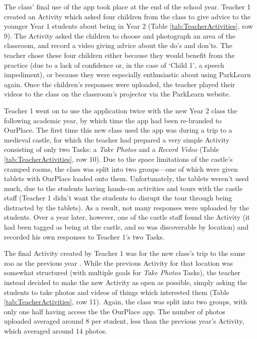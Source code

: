 The class' final use of the app took place at the end of the school year. Teacher 1 created an Activity which asked four children from the class to give advice to the younger Year 1 students about being in Year 2 (Table \ref{tab:TeacherActivities}, row 9). The Activity asked the children to choose and photograph an area of the classroom, and record a video giving advice about the do’s and don’ts. The teacher chose these four children either because they would benefit from the practice (due to a lack of confidence or, in the case of ‘Child 1’, a speech impediment), or because they were especially enthusiastic about using ParkLearn again. Once the children's responses were uploaded, the teacher played their videos to the class on the classroom's projector via the ParkLearn website.

Teacher 1 went on to use the application twice with the new Year 2 class the following academic year, by which time the app had been re-branded to OurPlace. The first time this new class used the app was during a trip to a medieval castle, for which the teacher had prepared a very simple Activity consisting of only two Tasks: a \textit{Take Photos} and a \textit{Record Video} (Table \ref{tab:TeacherActivities}, row 10). Due to the space limitations of the castle's cramped rooms, the class was split into two groups---one of which were given tablets with OurPlace loaded onto them. Unfortunately, the tablets weren't used much, due to the students having hands-on activities and tours with the castle staff (Teacher 1 didn't want the students to disrupt the tour through being distracted by the tablets). As a result, not many responses were uploaded by the students. Over a year later, however, one of the castle staff found the Activity (it had been tagged as being at the castle, and so was discoverable by location) and recorded his own responses to Teacher 1's two Tasks.

The final Activity created by Teacher 1 was for the new class's trip to the same zoo as the previous year . While the previous Activity for that location was somewhat structured (with multiple goals for \textit{Take Photos} Tasks), the teacher instead decided to make the new Activity as open as possible, simply asking the students to take photos and videos of things which interested them (Table \ref{tab:TeacherActivities}, row 11). Again, the class was split into two groups, with only one half having access the the OurPlace app. The number of photos uploaded averaged around 8 per student, less than the previous year's Activity, which averaged around 14 photos.

